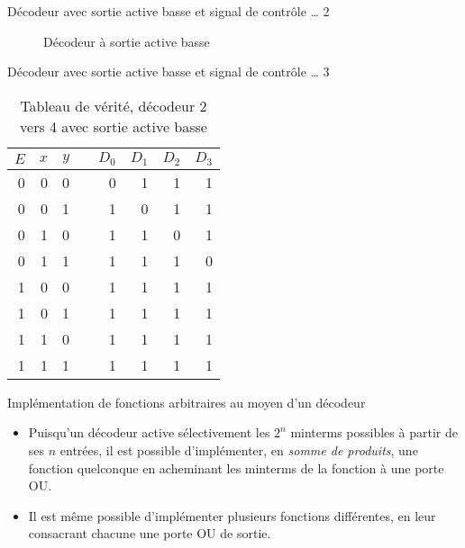 \documentclass[presentation]{beamer}
\begin{document}
\begin{frame}[label={sec:orgd88ee28}]{Décodeur avec sortie active basse et signal de contrôle \ldots{} 2}
\begin{figure}[htbp]
\centering

\caption{\label{fig:org3fef8aa}Décodeur à sortie active basse}
\end{figure}
\end{frame}

\begin{frame}[label={sec:org7215aee}]{Décodeur avec sortie active basse et signal de contrôle \ldots{} 3}
\begin{table}[htbp]
\caption{\label{tab:orgd089392}Tableau de vérité, décodeur 2 vers 4 avec sortie active basse}
\centering
\begin{tabular}{rrrlrrrr}
\(E\) & \(x\) & \(y\) &  & \(D_0\) & \(D_1\) & \(D_2\) & \(D_3\)\\
\hline
0 & 0 & 0 &  & 0 & 1 & 1 & 1\\
0 & 0 & 1 &  & 1 & 0 & 1 & 1\\
0 & 1 & 0 &  & 1 & 1 & 0 & 1\\
0 & 1 & 1 &  & 1 & 1 & 1 & 0\\
1 & 0 & 0 &  & 1 & 1 & 1 & 1\\
1 & 0 & 1 &  & 1 & 1 & 1 & 1\\
1 & 1 & 0 &  & 1 & 1 & 1 & 1\\
1 & 1 & 1 &  & 1 & 1 & 1 & 1\\
\end{tabular}
\end{table}
\end{frame}


\begin{frame}[label={sec:org91d4a93}]{Implémentation de fonctions arbitraires au moyen d'un décodeur}
\begin{itemize}
\item Puisqu'un décodeur active sélectivement les \(2^n\) minterms possibles à partir de ses \(n\) entrées, il est possible d'implémenter, en \emph{somme de produits}, une fonction quelconque en acheminant les minterms de la fonction à une porte OU.

\item Il est même possible d'implémenter plusieurs fonctions différentes, en leur consacrant chacune une porte OU de sortie.
\end{itemize}
\end{frame}
\end{document}
